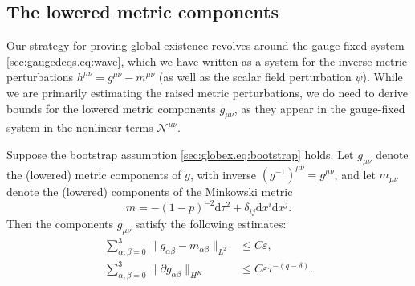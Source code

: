 \documentclass{article}
\newcommand{\de}{\mathrm{d}}
\newcommand{\mc}{\mathcal}
\newcommand{\ve}{\varepsilon}
\newcommand{\pa}{\partial}
\begin{document}
\subsection{The lowered metric components}
Our strategy for proving global existence revolves around the gauge-fixed system \eqref{sec:gaugedeqs.eq:wave}, which we have written as a system for the inverse metric perturbations $h^{\mu\nu} = g^{\mu\nu} - m^{\mu\nu}$ (as well as the scalar field perturbation $\psi$). While we are primarily estimating the raised metric perturbations, we do need to derive bounds for the lowered metric components $g_{\mu\nu}$, as they appear in the gauge-fixed system in the nonlinear terms $\mc{N}^{\mu\nu}$.
\begin{lemma}\label{sec:bootbound.lem:loweredmetests}
    Suppose the bootstrap assumption \eqref{sec:globex.eq:bootstrap} holds. Let $g_{\mu\nu}$ denote the (lowered) metric components of $g$, with inverse $(g^{-1})^{\mu\nu} = g^{\mu\nu}$, and let $m_{\mu\nu}$ denote the (lowered) components of the Minkowski metric
    \begin{equation}
        m = -(1-p)^{-2}\de \tau^2 + \delta_{ij}\de x^i \de x^j.
    \end{equation}
    Then the components $g_{\mu\nu}$ satisfy the following estimates:
    \begin{align}
        \sum_{\alpha,\beta = 0}^3\|g_{\alpha\beta} - m_{\alpha\beta}\|_{L^2} &\leq C\ve,\label{sec:bootbound.eq:loweredmetl2}\\
        \sum_{\alpha,\beta = 0}^3 \|\pa g_{\alpha\beta}\|_{H^K}&\leq C\ve \tau^{-(q-\delta)}.\label{sec:bootbound.eq:loweredmetderiv}
    \end{align}
\end{lemma}
\end{document}
